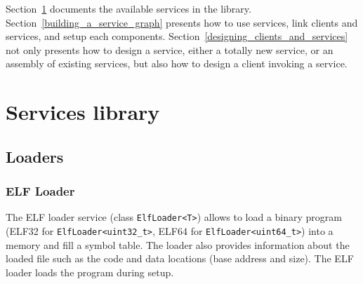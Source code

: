 Section~\ref{services_library} documents the available services in the library. Section~\ref{building_a_service_graph} presents how to use services, link clients and services, and setup each components. Section~\ref{designing_clients_and_services} not only presents how to design a service, either a totally new service, or an assembly of existing services, but also how to design a client invoking a service.


\section{Services library}
\label{services_library}

\subsection{Loaders}

\subsubsection{ELF Loader}

The ELF loader service (class \texttt{ElfLoader<T>}) allows to load a binary program (ELF32 for \texttt{ElfLoader<uint32\_t>}, ELF64 for \texttt{ElfLoader<uint64\_t>}) into a memory and fill a symbol table. The loader also provides information about the loaded file such as the code and data locations (base address and size). The ELF loader loads the program during setup.

